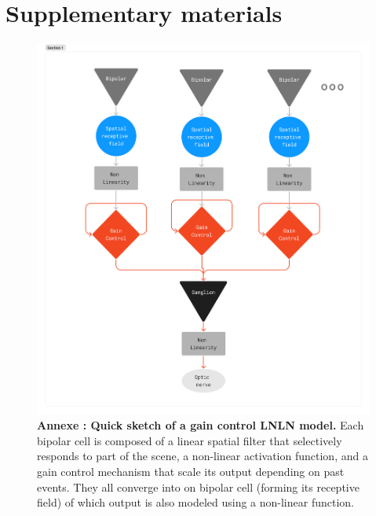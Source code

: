 \section*{Supplementary materials}\label{sec:annexe}

\begin{figure}[ht]
    \centering
    \includegraphics[width=\textwidth]{pics/GCModelDiagram.png}
    \caption{\textbf{Annexe : Quick sketch of a gain control LNLN model.} Each bipolar
        cell is
        composed of a linear spatial filter that selectively responds to part
        of the scene,
        a non-linear activation function, and a gain control mechanism that
        scale its output
        depending on past events. They all converge into on bipolar cell
        (forming its receptive field)
        of which output is also modeled using a non-linear function.}
    \label{fig:LNLN}
\end{figure}

